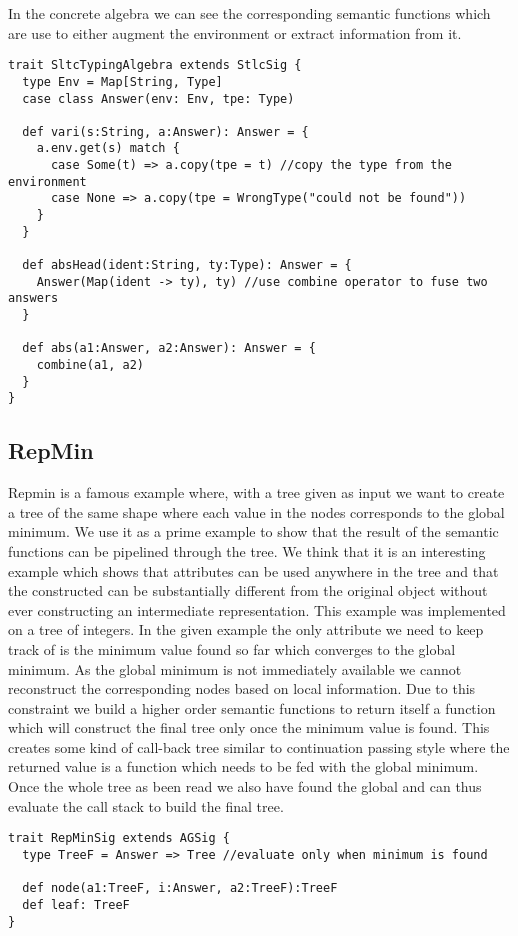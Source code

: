In the concrete algebra we can see the corresponding semantic functions which are use to either augment the environment or extract information from it.

\begin{lstlisting}
trait SltcTypingAlgebra extends StlcSig {
  type Env = Map[String, Type]
  case class Answer(env: Env, tpe: Type)

  def vari(s:String, a:Answer): Answer = {
    a.env.get(s) match {
      case Some(t) => a.copy(tpe = t) //copy the type from the environment
      case None => a.copy(tpe = WrongType("could not be found"))
    }
  }

  def absHead(ident:String, ty:Type): Answer = {
    Answer(Map(ident -> ty), ty) //use combine operator to fuse two answers 
  }

  def abs(a1:Answer, a2:Answer): Answer = {
    combine(a1, a2)
  }
}
\end{lstlisting}

\subsection{RepMin}
Repmin is a famous example where, with a tree given as input we want to create a tree of the same shape where each value in the nodes corresponds to the global minimum. 
We use it as a prime example to show that the result of the semantic functions can be pipelined through the tree. We think that it is an interesting example which shows that attributes can be used anywhere in the tree and that the constructed can be substantially different from the original object without ever constructing an intermediate representation.
This example was implemented on a tree of integers. In the given example the only attribute we need to keep track of is the minimum value found so far which converges to the global minimum. As the global minimum is not immediately available we cannot reconstruct the corresponding nodes based on local information. Due to this constraint we build a higher order semantic functions to return itself a function which will construct the final tree only once the minimum value is found. This creates some kind of call-back tree similar to continuation passing style where the  returned value is a function which needs to be fed with the global minimum. Once the whole tree as been read we also have found the global and can thus evaluate the call stack to build the final tree.

\begin{lstlisting}
trait RepMinSig extends AGSig {
  type TreeF = Answer => Tree //evaluate only when minimum is found

  def node(a1:TreeF, i:Answer, a2:TreeF):TreeF
  def leaf: TreeF
}
\end{lstlisting}

